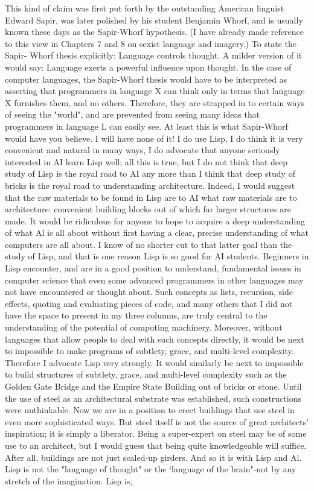         This kind of claim was first put forth by the outstanding American linguist
Edward Sapir, was later polished by his student Benjamin Whorf, and is usually
known these days as the Sapir-Whorf hypothesis. (I have already made reference to
this view in Chapters 7 and 8 on sexist language and imagery.) To state the Sapir-
Whorf thesis explicitly: Language controls thought. A milder version of it would say:
Language exerts a powerful influence upon thought.
        In the case of computer languages, the Sapir-Whorf thesis would have to be
interpreted as asserting that programmers in language X can think only in terms that
language X furnishes them, and no others. Therefore, they are strapped in to certain
ways of seeing the "world", and are prevented from seeing many ideas that
programmers in language L can easily see. At least this is what Sapir-Whorf would
have you believe. I will have none of it!
        I do use Lisp, I do think it is very convenient and natural in many ways, I do
advocate that anyone seriously interested in AI learn Lisp well; all this is true, but I do
not think that deep study of Lisp is the royal road to AI any more than I think that
deep study of bricks is the royal road to understanding architecture. Indeed, I would
suggest that the raw materials to be found in Lisp are to AI what raw materials are to
architecture: convenient building blocks out of which far larger structures are made.
        It would be ridiculous for anyone to hope to acquire a deep understanding of
what Al is all about without first having a clear, precise understanding of what
computers are all about. I know of no shorter cut to that latter goal than the study of
Lisp, and that is one reason Lisp is so good for AI students. Beginners in Lisp
encounter, and are in a good position to understand, fundamental issues in computer
science that even some advanced programmers in other languages may not have
encountered or thought about. Such concepts as lists, recursion, side effects, quoting
and evaluating pieces of code, and many others that I did not have the space to present
in my three columns, are truly central to the understanding of the potential of
computing machinery. Moreover, without languages that allow people to deal with
such concepts directly, it would be next to impossible to make programs of subtlety,
grace, and multi-level complexity. Therefore I advocate Lisp very strongly.
        It would similarly be next to impossible to build structures of subtlety, grace,
and multi-level complexity such as the Golden Gate Bridge and the Empire State
Building out of bricks or stone. Until the use of steel as an architectural substrate was
established, such constructions were unthinkable. Now we are in a position to erect
buildings that use steel in even more sophisticated ways. But steel itself is not the
source of great architects' inspiration; it is simply a liberator. Being a super-expert on
steel may be of some use to an architect, but I would guess that being quite
knowledgeable will suffice. After all, buildings are not just scaled-up girders. And so
it is with Lisp and Al. Lisp is not the "language of thought" or the `language of the
brain"-not by any stretch of the imagination. Lisp is,




